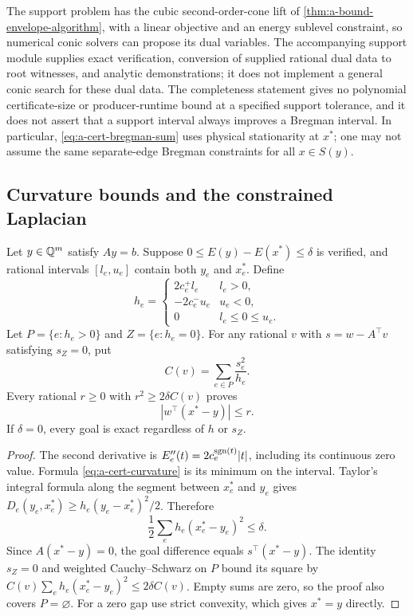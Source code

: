 The support problem has the cubic second-order-cone lift of
\cref{thm:a-bound-envelope-algorithm}, with a linear objective and
an energy sublevel constraint, so numerical conic solvers can propose
its dual variables. The accompanying support module supplies exact
verification, conversion of supplied rational dual data to root
witnesses, and analytic demonstrations; it does not implement a general
conic search for these dual data. The completeness statement gives no
polynomial certificate-size or producer-runtime bound at a specified
support tolerance, and it does not assert that a support interval
always improves a Bregman interval. In particular,
\eqref{eq:a-cert-bregman-sum} uses physical stationarity at $x^*$;
one may not assume the same separate-edge Bregman constraints for
all $x\in S(y)$.

\subsection{Curvature bounds and the constrained Laplacian}

\begin{theorem}
\label{thm:a-cert-hessian}
Let $y\in\mathbb{Q}^m$ satisfy $Ay=b$.
Suppose $0\le E(y)-E(x^*)\le\delta$ is verified, and rational
intervals $[l_e,u_e]$ contain both $y_e$ and $x_e^*$. Define
\begin{equation}
 h_e=\begin{cases}
 2c_e^+l_e&l_e>0,\\
 -2c_e^-u_e&u_e<0,\\
 0&l_e\le0\le u_e.
 \end{cases}
 \label{eq:a-cert-curvature}
\end{equation}
Let $P=\{e:h_e>0\}$ and $Z=\{e:h_e=0\}$. For any rational
$v$ with $s=w-A^\top v$ satisfying $s_Z=0$, put
\begin{equation}
 C(v)=\sum_{e\in P}\frac{s_e^2}{h_e}.
 \label{eq:a-cert-factor}
\end{equation}
Every rational $r\ge0$ with $r^2\ge2\delta C(v)$ proves
\begin{equation}
 |w^\top(x^*-y)|\le r.
 \label{eq:a-cert-goal-radius}
\end{equation}
If $\delta=0$, every goal is exact regardless of $h$ or $s_Z$.
\end{theorem}
\begin{proof}
The second derivative is $E_e''(t)=2c_e^{\operatorname{sgn}(t)}|t|$, including
its continuous zero value. Formula \eqref{eq:a-cert-curvature} is
its minimum on the interval. Taylor's integral formula along the
segment between $x_e^*$ and $y_e$ gives
$D_e(y_e,x_e^*)\ge h_e(y_e-x_e^*)^2/2$. Therefore
\begin{equation}
 \frac12\sum_e h_e(x_e^*-y_e)^2\le\delta.
 \label{eq:a-cert-quadratic-error}
\end{equation}
Since $A(x^*-y)=0$, the goal difference equals $s^\top(x^*-y)$.
The identity $s_Z=0$ and weighted Cauchy--Schwarz on $P$ bound its square by
$C(v)\sum_e h_e(x_e^*-y_e)^2\le2\delta C(v)$.
Empty sums are zero, so the proof also covers $P=\varnothing$.
For a zero gap use strict convexity, which gives $x^*=y$ directly.
\end{proof}

